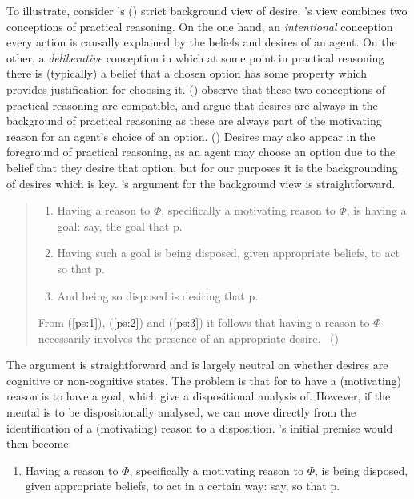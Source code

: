 \documentclass[10pt]{article}
\begin{document}
To illustrate, consider \citeauthor{Pettit:1990aa}'s (\citeyear{Pettit:1990aa}) strict background view of desire.
\citeauthor{Pettit:1990aa}'s view  combines two conceptions of practical reasoning.
On the one hand, an \emph{intentional} conception every action is causally explained by the beliefs and desires of an agent.
On the other, a \emph{deliberative} conception in which at some point in practical reasoning there is (typically) a belief that a chosen option has some property which provides justification for choosing it.
(\citeyear[565--566]{Pettit:1990aa})
\citeauthor{Pettit:1990aa} observe that these two conceptions of practical reasoning are compatible, and argue that desires are always in the background of practical reasoning as these are always part of the motivating reason for an agent's choice of an option.
(\citeyear[573]{Pettit:1990aa})
Desires may also appear in the foreground of practical reasoning, as an agent may choose an option due to the belief that they desire that option, but for our purposes it is the backgrounding of desires which is key.
\citeauthor{Pettit:1990aa}'s argument for the background view is straightforward.
\begin{quote}
  \begin{enumerate}
  \item\label{ps:1} Having a reason to \(\Phi\), specifically a motivating reason to \(\Phi\), is having a goal: say, the goal that p.
  \item\label{ps:2} Having such a goal is being disposed, given appropriate beliefs, to act so that p.
  \item\label{ps:3} And being so disposed is desiring that p.
  \end{enumerate}
  From (\ref{ps:1}), (\ref{ps:2}) and (\ref{ps:3}) it follows that having a reason to \(\Phi\)-necessarily involves the presence of an appropriate desire.\nolinebreak
  \mbox{ }\hfill(\citeyear[573]{Pettit:1990aa})
\end{quote}
The argument is straightforward and is largely neutral on whether desires are cognitive or non-cognitive states.
The problem is that for \citeauthor{Pettit:1990aa} to have a (motivating) reason is to have a goal, which \citeauthor{Pettit:1990aa} give a dispositional analysis of.
However, if the mental is to be dispositionally analysed, we can move directly from the identification of a (motivating) reason to a disposition.
\citeauthor{Pettit:1990aa}'s initial premise would then become:
\begin{enumerate}[label=(\arabic*\('\))]
\item\label{ps:1R} Having a reason to \(\Phi\), specifically a motivating reason to \(\Phi\), is being disposed, given appropriate beliefs, to act in a certain way: say, so that p.
\end{enumerate}
\end{document}

